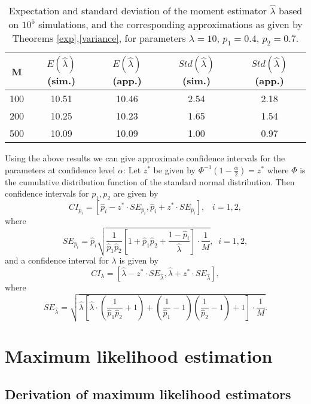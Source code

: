 \documentclass[a4paper,10pt,twoside]{article}
\begin{document}
\begin{table}\label{tab1}
	\begin{center}
		\begin{tabular}{|c|c|c|c|c|}
			\hline {M} & {$E(\hat{\lambda})$ (sim.)} & {$E(\hat{\lambda})$ (app.)} & {$Std(\hat{\lambda})$ (sim.)} & {$Std(\hat{\lambda})$ (app.)} \\ 
			\hline	100 & 10.51 & 10.46 & 2.54 & 2.18\\
			\hline	200 & 10.25 & 10.23 & 1.65 & 1.54 \\
			\hline	500 & 10.09 & 10.09 & 1.00 & 0.97\\
			\hline 
		\end{tabular}
	\end{center} 
	\caption{Expectation and standard deviation of the moment estimator $\hat{\lambda}$ based on $10^5$ simulations, and the 
		corresponding approximations as given by Theorems \ref{exp},\ref{variance}, for parameters $\lambda=10$, $p_1=0.4$, $p_2=0.7$.}
\end{table}


Using the above results we can give approximate confidence intervals for the parameters at confidence  level $\alpha$:
Let $z^*$ be given by $\Phi^{-1}(1-\frac{\alpha}{2})=z^*$ where $\Phi$ is the cumulative distribution function of the standard normal distribution.
Then confidence intervals for $p_1,p_2$ are given by
$$CI_{p_i}=\left[\hat{p}_i-z^* \cdot SE_{\hat{p}_i},\hat{p}_i+z^* \cdot SE_{\hat{p}_i}\right],\;\;\;i=1,2,$$
where
$$SE_{\hat{p}_i}=\hat{p}_i\sqrt{\frac{1}{\hat{p}_1 \hat{p}_2}\left[1+\hat{p}_1\hat{p}_2 +\frac{1
		- \hat{p}_i}{\hat{\lambda}}  \right]\cdot \frac{1}{M}},\;\;i=1,2,$$
and a confidence interval for $\lambda$ is given by
$$CI_{\lambda}=\left[\hat{\lambda}-z^* \cdot SE_{\hat{\lambda}},\hat{\lambda}+z^* \cdot SE_{\hat{\lambda}}\right],$$
where
$$SE_{\hat{\lambda}}= \sqrt{\hat{\lambda} \left[\hat{\lambda}\cdot \left(\frac{1}{\hat{p}_1\hat{p}_2}+1\right)+ \left(\frac{1}{\hat{p}_1}-1 \right)\left(\frac{1}{\hat{p}_2}-1\right)+1 \right]\cdot \frac{1}{M}}.$$

\section{Maximum likelihood estimation}
\label{mlest}

\subsection{Derivation of maximum likelihood estimators}
\end{document}
